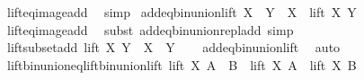 \begin{isabellebody}
%
\isatagproof
{}\isamarkupfalse%
\ lift{\isacharunderscore}{\kern0pt}eq{\isacharunderscore}{\kern0pt}image{\isacharunderscore}{\kern0pt}add\ \isamarkupfalse%
\ simp%
\endisatagproof
{\isafoldproof}%
%
\isadelimproof
\isanewline
%
\endisadelimproof
\isanewline
{}\isamarkupfalse%
\ add{\isacharunderscore}{\kern0pt}eq{\isacharunderscore}{\kern0pt}bin{\isacharunderscore}{\kern0pt}union{\isacharunderscore}{\kern0pt}lift{\isacharcolon}{\kern0pt}\ {\isachardoublequoteopen}X\ {\isacharplus}{\kern0pt}\ Y\ {\isacharequal}{\kern0pt}\ X\ {\isasymunion}\ lift\ X\ Y{\isachardoublequoteclose}\isanewline
%
\isadelimproof
\ \ %
\endisadelimproof
%
\isatagproof
{}\isamarkupfalse%
\ lift{\isacharunderscore}{\kern0pt}eq{\isacharunderscore}{\kern0pt}image{\isacharunderscore}{\kern0pt}add\ \isamarkupfalse%
\ {\isacharparenleft}{\kern0pt}subst\ add{\isacharunderscore}{\kern0pt}eq{\isacharunderscore}{\kern0pt}bin{\isacharunderscore}{\kern0pt}union{\isacharunderscore}{\kern0pt}repl{\isacharunderscore}{\kern0pt}add{\isacharparenright}{\kern0pt}\ simp%
\endisatagproof
{\isafoldproof}%
%
\isadelimproof
\isanewline
%
\endisadelimproof
\isanewline
{}\isamarkupfalse%
\ lift{\isacharunderscore}{\kern0pt}subset{\isacharunderscore}{\kern0pt}add{\isacharcolon}{\kern0pt}\ {\isachardoublequoteopen}lift\ X\ Y\ {\isasymsubseteq}\ X\ {\isacharplus}{\kern0pt}\ Y{\isachardoublequoteclose}\isanewline
%
\isadelimproof
\ \ %
\endisadelimproof
%
\isatagproof
{}\isamarkupfalse%
\ add{\isacharunderscore}{\kern0pt}eq{\isacharunderscore}{\kern0pt}bin{\isacharunderscore}{\kern0pt}union{\isacharunderscore}{\kern0pt}lift\ \isamarkupfalse%
\ auto%
\endisatagproof
{\isafoldproof}%
%
\isadelimproof
%
\endisadelimproof
%
\isadelimdocument
%
\endisadelimdocument
%
\isatagdocument
%
\isamarkuptrue%
%
\endisatagdocument
{\isafolddocument}%
%
\isadelimdocument
%
\endisadelimdocument
{}\isamarkupfalse%
\ lift{\isacharunderscore}{\kern0pt}bin{\isacharunderscore}{\kern0pt}union{\isacharunderscore}{\kern0pt}eq{\isacharunderscore}{\kern0pt}lift{\isacharunderscore}{\kern0pt}bin{\isacharunderscore}{\kern0pt}union{\isacharunderscore}{\kern0pt}lift{\isacharcolon}{\kern0pt}\ {\isachardoublequoteopen}lift\ X\ {\isacharparenleft}{\kern0pt}A\ {\isasymunion}\ B{\isacharparenright}{\kern0pt}\ {\isacharequal}{\kern0pt}\ lift\ X\ A\ {\isasymunion}\ lift\ X\ B{\isachardoublequoteclose}\isanewline
%
\isadelimproof
\ \ %

\end{isabellebody}
